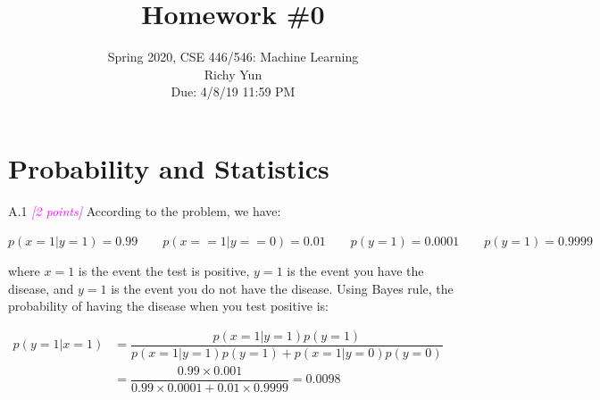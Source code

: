 \documentclass{article}
\date{{}}
\newcommand{\1}{\mathbf{1}}
\newcommand{\points}[1]{\small\textcolor{magenta}{\emph{[#1 points]}} \normalsize}
\begin{document}
\title{Homework \#0}
\author{\normalsize{Spring 2020, CSE 446/546: Machine Learning}\\
\normalsize{Richy Yun} \\
\normalsize{Due: 4/8/19  11:59 PM}}
\maketitle


\section*{Probability and Statistics}
A.1 \points{2} According to the problem, we have:
\begin{center}
$p(x=1|y=1)=0.99 \qquad p(x==1|y==0)=0.01 \qquad p(y=1)=0.0001 \qquad p(y=1)=0.9999$
\end{center}
where $x=1$ is the event the test is positive, $y=1$ is the event you have the disease, and $y=1$ is the event you do not have the disease. Using Bayes rule, the probability of having the disease when you test positive is: 
\begin{center}
	$\begin{aligned}
		p(y=1|x=1)&=\dfrac{p(x=1|y=1)p(y=1)}{p(x=1|y=1)p(y=1)+p(x=1|y=0)p(y=0)}\\
		&=\dfrac{0.99\times0.001}{0.99\times0.0001+0.01\times0.9999}=0.0098
	\end{aligned}$
\end{center}
\end{document}
